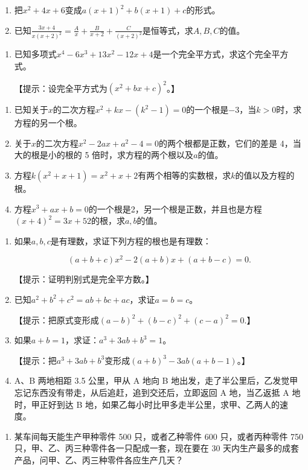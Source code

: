 \begin{enumerate}[start=9]
\item
  把\(x^{2} + 4x + 6\)变成\(a(x + 1)^{2} + b(x + 1) + c\)的形式。
\item
  已知\(\frac{3x + 4}{x(x + 2)^2} = \frac{A}{x} + \frac{B}{x + 2} + \frac{C}{(x + 2)^2}\)是恒等式，求\(A, B, C\)的值。
\end{enumerate}

\begin{enumerate}[start=11,label={*\arabic*.}]
\item
  已知多项式\(x^4 - 6x^3 + 13x^2 - 12x + 4\)是一个完全平方式，求这个完全平方式。

【提示：设完全平方式为\((x^{2}+bx+c)^{2}\)。】

\end{enumerate}
\begin{enumerate}[start=12]
\item
  已知关于\(x\)的二次方程\(x^{2} + kx - (k^{2} - 1) = 0\)的一个根是\(-3\)，当\(k > 0\)时，求方程的另一个根。
\item
  关于\(x\)的二次方程\(x^{2} - 2ax + a^{2} - 4 = 0\)的两个根都是正数，它们的差是
  4，当大的根是小的根的 5 倍时，求方程的两个根以及\(a\)的值。
\item
  方程\(k(x^2 + x + 1) = x^2 + x + 2\)有两个相等的实数根，求\(k\)的值以及方程的根。
\item
  方程\(x^{3} + ax + b = 0\)的一个根是2，另一个根是正数，并且也是方程\((x + 4)^{2} = 3x + 52\)的根，求\(a, b\)的值。
\end{enumerate}

\begin{enumerate}[start=16,label={*\arabic*.}]
\item
  如果\(a, b, c\)是有理数，求证下列方程的根也是有理数：

\[
(a + b + c) x ^ {2} - 2 (a + b) x + (a + b - c) = 0.
\]

【提示：证明判别式是完全平方数。】

\item
  已知\(a^2 + b^2 + c^2 = ab + bc + ac\)，求证\(a = b = c\)。

【提示：把原式变形成\((a-b)^{2}+(b-c)^{2}+(c-a)^{2}=0.\)】

\item
  如果\(a + b = 1\)，求证：\(a^3 + 3ab + b^3 = 1\)。

【提示：把\(a^3 + 3ab + b^3\)变形成\((a + b)^3 - 3ab(a + b - 1)\)。】

\item
  A、B 两地相距 3.5 公里，甲从 A 地向 B
地出发，走了半公里后，乙发觉甲忘记东西没有带走，从后追赶，追到交还后，立即返回
A 地，当乙返抵 A 地时，甲正好到达 B
地，如果乙每小时比甲多走半公里，求甲、乙两人的速度。

\end{enumerate}
\begin{enumerate}[start=20]
\item
  某车间每天能生产甲种零件 500 只，或者乙种零件 600 只，或者丙种零件 750
  只，甲、乙、丙三种零件各一只配成一套，现在要在 30
  天内生产最多的成套产品，问甲、乙、丙三种零件各应生产几天？
\end{enumerate}

